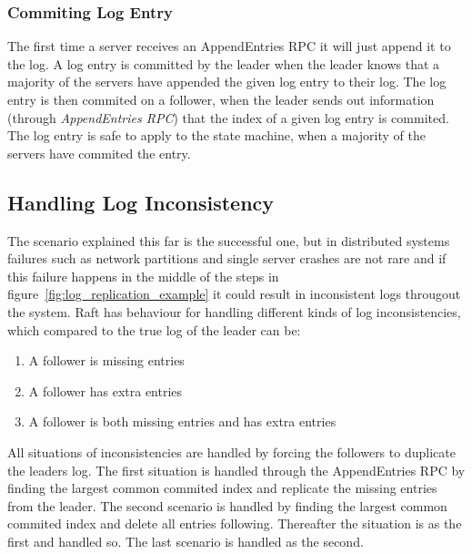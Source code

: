
\subsubsection{Commiting Log Entry} %
\label{ssub:commiting_log_entry}

The first time a server receives an AppendEntries RPC it will just append it to the log. A log entry is committed by the leader when the leader knows that a majority of the servers have appended the given log entry to their log. The log entry is then commited on a follower, when the leader sends out information (through \emph{AppendEntries RPC}) that the index of a given log entry is commited. The log entry is safe to apply to the state machine, when a majority of the servers have commited the entry.


\subsection{Handling Log Inconsistency} %
\label{sub:handling_log_inconsistency}

The scenario explained this far is the successful one, but in distributed systems failures such as network partitions and single server crashes are not rare and if this failure happens in the middle of the steps in figure~\ref{fig:log_replication_example} it could result in inconsistent logs througout the system. Raft has behaviour for handling different kinds of log inconsistencies, which compared to the true log of the leader can be:

\begin{enumerate}
  \item A follower is missing entries
  \item A follower has extra entries
  \item A follower is both missing entries and has extra entries
\end{enumerate}

All situations of inconsistencies are handled by forcing the followers to duplicate the leaders log. The first situation is handled through the AppendEntries RPC by finding the largest common commited index and replicate the missing entries from the leader. The second scenario is handled by finding the largest common commited index and delete all entries following. Thereafter the situation is as the first and handled so. The last scenario is handled as the second.

